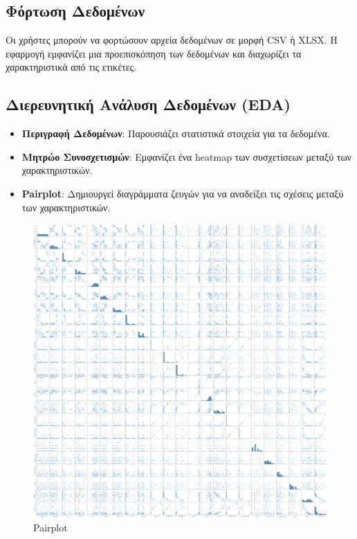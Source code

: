 \documentclass{article}
\begin{document}
\subsection{Φόρτωση Δεδομένων}
Οι χρήστες μπορούν να φορτώσουν αρχεία δεδομένων σε μορφή CSV ή XLSX. Η εφαρμογή εμφανίζει μια προεπισκόπηση των δεδομένων και διαχωρίζει τα χαρακτηριστικά από τις ετικέτες.

\subsection{Διερευνητική Ανάλυση Δεδομένων (EDA)}
\begin{itemize}
    \item \textbf{Περιγραφή Δεδομένων}: Παρουσιάζει στατιστικά στοιχεία για τα δεδομένα.
    \item \textbf{Μητρώο Συνοσχετισμών}: Εμφανίζει ένα heatmap των συσχετίσεων μεταξύ των χαρακτηριστικών.
    \item \textbf{Pairplot}: Δημιουργεί διαγράμματα ζευγών για να αναδείξει τις σχέσεις μεταξύ των χαρακτηριστικών.
\end{itemize}

\begin{figure}[h!]
    \centering
    \includegraphics[width=\textwidth]{Pairplot.png}
    \caption{Pairplot}
    \label{fig:pairplot}
\end{figure}
\end{document}
